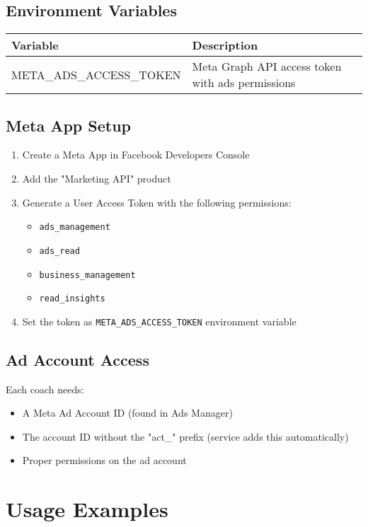 \documentclass[11pt,a4paper]{article}
\begin{document}
\subsection{Environment Variables}
\begin{longtable}{L{4cm}L{8cm}}
\toprule
\textbf{Variable} & \textbf{Description} \\
\midrule
META\_ADS\_ACCESS\_TOKEN & Meta Graph API access token with ads permissions \\
\bottomrule
\end{longtable}

\subsection{Meta App Setup}
\begin{enumerate}
  \item Create a Meta App in Facebook Developers Console
  \item Add the "Marketing API" product
  \item Generate a User Access Token with the following permissions:
    \begin{itemize}
      \item \texttt{ads\_management}
      \item \texttt{ads\_read}
      \item \texttt{business\_management}
      \item \texttt{read\_insights}
    \end{itemize}
  \item Set the token as \texttt{META\_ADS\_ACCESS\_TOKEN} environment variable
\end{enumerate}

\subsection{Ad Account Access}
Each coach needs:
\begin{itemize}
  \item A Meta Ad Account ID (found in Ads Manager)
  \item The account ID without the "act\_" prefix (service adds this automatically)
  \item Proper permissions on the ad account
\end{itemize}

\section{Usage Examples}
\end{document}
